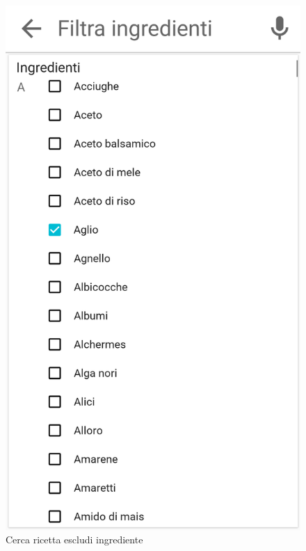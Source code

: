 \begin{figure}[H]
\begin{minipage}{.49\textwidth}
		\includegraphics[width=\textwidth]{img/wireframe/search_page_esclusione.png}
		\caption{Cerca ricetta escludi ingrediente}
	\end{minipage}
\end{figure}